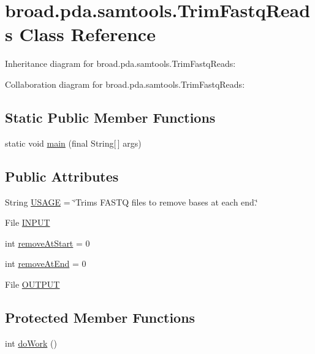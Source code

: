 \hypertarget{classbroad_1_1pda_1_1samtools_1_1_trim_fastq_reads}{\section{broad.\+pda.\+samtools.\+Trim\+Fastq\+Reads Class Reference}
\label{classbroad_1_1pda_1_1samtools_1_1_trim_fastq_reads}
}


Inheritance diagram for broad.\+pda.\+samtools.\+Trim\+Fastq\+Reads\+:


Collaboration diagram for broad.\+pda.\+samtools.\+Trim\+Fastq\+Reads\+:
\subsection*{Static Public Member Functions}
\begin{DoxyCompactItemize}
\item 
static void \hyperlink{classbroad_1_1pda_1_1samtools_1_1_trim_fastq_reads_a9a45fa8ea46d4f2b546b20417c7b58f3}{main} (final String\mbox{[}$\,$\mbox{]} args)
\end{DoxyCompactItemize}
\subsection*{Public Attributes}
\begin{DoxyCompactItemize}
\item 
String \hyperlink{classbroad_1_1pda_1_1samtools_1_1_trim_fastq_reads_a07996cad24bf5196d1366fd56ad0ce48}{U\+S\+A\+G\+E} = \char`\"{}Trims F\+A\+S\+T\+Q files to remove bases at each end.\char`\"{}
\item 
File \hyperlink{classbroad_1_1pda_1_1samtools_1_1_trim_fastq_reads_a0f8bf4e7d4271018cf6b4dfc15fe217a}{I\+N\+P\+U\+T}
\item 
int \hyperlink{classbroad_1_1pda_1_1samtools_1_1_trim_fastq_reads_a618d1e43f9536882178496bf51b87212}{remove\+At\+Start} = 0
\item 
int \hyperlink{classbroad_1_1pda_1_1samtools_1_1_trim_fastq_reads_aeab015239d54246db603d0c69a301cb7}{remove\+At\+End} = 0
\item 
File \hyperlink{classbroad_1_1pda_1_1samtools_1_1_trim_fastq_reads_a40758b541af8cc732b1279a5308f62ef}{O\+U\+T\+P\+U\+T}
\end{DoxyCompactItemize}
\subsection*{Protected Member Functions}
\begin{DoxyCompactItemize}
\item 
int \hyperlink{classbroad_1_1pda_1_1samtools_1_1_trim_fastq_reads_a606c70f78844f8f56298d276eb51ea04}{do\+Work} ()
\end{DoxyCompactItemize}


